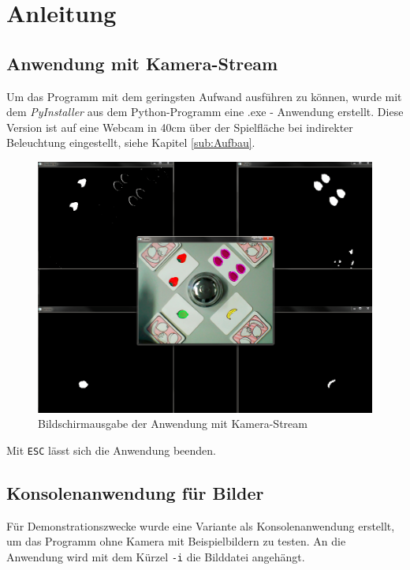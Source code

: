 
\section{Anleitung}
\label{sec:Anleitung}

\subsection{Anwendung mit Kamera-Stream}

Um das Programm mit dem geringsten Aufwand ausführen zu können, wurde mit dem \emph{PyInstaller} aus dem Python-Programm eine .exe - Anwendung erstellt. Diese Version ist auf eine Webcam in 40cm über der Spielfläche bei indirekter Beleuchtung eingestellt, siehe Kapitel \ref{sub:Aufbau}.
\begin{figure}[H]
    \centering
    \includegraphics[width=15cm]{Abbildungen/HalliGalli01}
    \caption[Aus]{Bildschirmausgabe der Anwendung mit Kamera-Stream}
    \label{fig:Ausgabe}
\end{figure}
Mit \lstinline{ESC} lässt sich die Anwendung beenden. 

\subsection{Konsolenanwendung für Bilder}
Für Demonstrationszwecke wurde eine Variante als Konsolenanwendung erstellt, um das Programm ohne Kamera mit Beispielbildern zu testen. 
An die Anwendung wird mit dem Kürzel \lstinline{-i} die Bilddatei angehängt.
 
